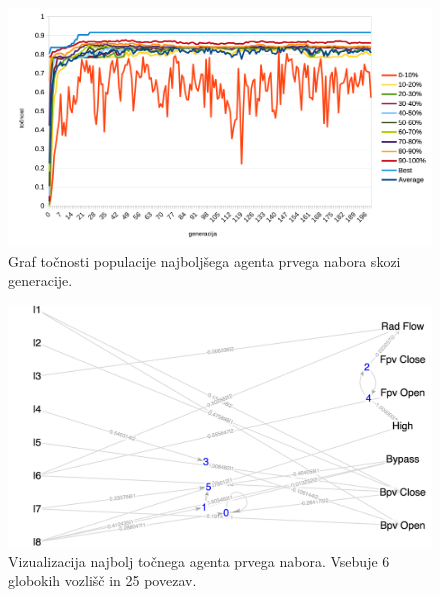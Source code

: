 \begin{figure}[H]
    \begin{center}
        \includegraphics[width=13cm]{statlog/1/acc}
    \end{center}
    \caption{Graf točnosti populacije najboljšega agenta prvega nabora skozi generacije.}
    \label{fig:statlog_acc_1}
\end{figure}


\begin{figure}[H]
    \begin{center}
        \includegraphics[width=13cm]{statlog/1/acc_g}
    \end{center}
    \caption{Vizualizacija najbolj točnega agenta prvega nabora. Vsebuje 6 globokih vozlišč in 25 povezav.}
    \label{fig:statlog_acc_1_g}
\end{figure}

